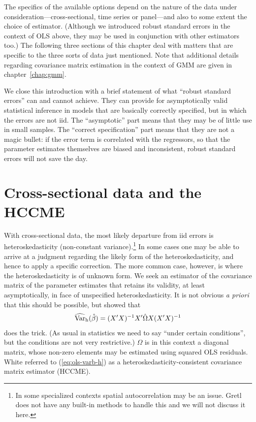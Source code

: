 The specifics of the available options depend on the nature of the
data under consideration---cross-sectional, time series or panel---and
also to some extent the choice of estimator.  (Although we introduced
robust standard errors in the context of OLS above, they may be used
in conjunction with other estimators too.)  The following three
sections of this chapter deal with matters that are specific to the
three sorts of data just mentioned.  Note that additional details
regarding covariance matrix estimation in the context of GMM are given
in chapter~\ref{chap:gmm}.

We close this introduction with a brief statement of what ``robust
standard errors'' can and cannot achieve.  They can provide for
asymptotically valid statistical inference in models that are
basically correctly specified, but in which the errors are not iid.
The ``asymptotic'' part means that they may be of little use in small
samples.  The ``correct specification'' part means that they are not a
magic bullet: if the error term is correlated with the regressors, so
that the parameter estimates themselves are biased and inconsistent,
robust standard errors will not save the day.


\section{Cross-sectional data and the HCCME}
\label{vcv-hccme}

With cross-sectional data, the most likely departure from iid errors
is heteroskedasticity (non-constant variance).\footnote{In some
  specialized contexts spatial autocorrelation may be an issue.  Gretl
  does not have any built-in methods to handle this and we will not
  discuss it here.}  In some cases one may be able to arrive at a
judgment regarding the likely form of the heteroskedasticity, and
hence to apply a specific correction.  The more common case, however,
is where the heteroskedasticity is of unknown form.  We seek an
estimator of the covariance matrix of the parameter estimates that
retains its validity, at least asymptotically, in face of unspecified
heteroskedasticity.  It is not obvious \textit{a priori} that this
should be possible, but \cite{white80} showed that
%
\begin{equation}
\label{eq:ols-varb-h}
\widehat{\mbox{Var}}_{\rm h}(\hat{\beta}) = 
       (X'X)^{-1} X' \hat{\Omega} X (X'X)^{-1}
\end{equation}
%
does the trick. (As usual in statistics we need to say ``under
certain conditions'', but the conditions are not very restrictive.)
$\hat{\Omega}$ is in this context a diagonal matrix, whose non-zero
elements may be estimated using squared OLS residuals.  White referred
to (\ref{eq:ols-varb-h}) as a heteroskedasticity-consistent covariance
matrix estimator (HCCME).

